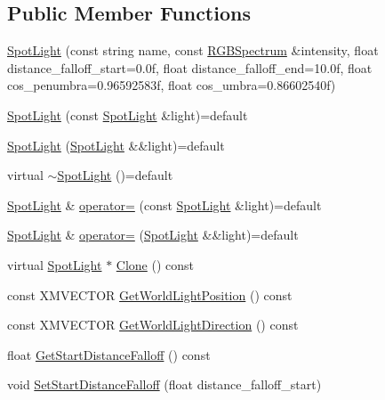 \subsection*{Public Member Functions}
\begin{DoxyCompactItemize}
\item 
\hyperlink{classmage_1_1_spot_light_a469dcb9cf484d682982c72e28003e6f7}{Spot\+Light} (const string name, const \hyperlink{structmage_1_1_r_g_b_spectrum}{R\+G\+B\+Spectrum} \&intensity, float distance\+\_\+falloff\+\_\+start=0.\+0f, float distance\+\_\+falloff\+\_\+end=10.\+0f, float cos\+\_\+penumbra=0.\+96592583f, float cos\+\_\+umbra=0.\+86602540f)
\item 
\hyperlink{classmage_1_1_spot_light_adac6974e9cbfdae4612e2d88229e654d}{Spot\+Light} (const \hyperlink{classmage_1_1_spot_light}{Spot\+Light} \&light)=default
\item 
\hyperlink{classmage_1_1_spot_light_a404e8f8f37100bff11042831ff22fe8f}{Spot\+Light} (\hyperlink{classmage_1_1_spot_light}{Spot\+Light} \&\&light)=default
\item 
virtual \hyperlink{classmage_1_1_spot_light_a924dd88ca89b3064d6cfce546eab322a}{$\sim$\+Spot\+Light} ()=default
\item 
\hyperlink{classmage_1_1_spot_light}{Spot\+Light} \& \hyperlink{classmage_1_1_spot_light_a65b316706e023797cfa219add1cf4d40}{operator=} (const \hyperlink{classmage_1_1_spot_light}{Spot\+Light} \&light)=default
\item 
\hyperlink{classmage_1_1_spot_light}{Spot\+Light} \& \hyperlink{classmage_1_1_spot_light_a540360b14d52494a792066254d1cd6db}{operator=} (\hyperlink{classmage_1_1_spot_light}{Spot\+Light} \&\&light)=default
\item 
virtual \hyperlink{classmage_1_1_spot_light}{Spot\+Light} $\ast$ \hyperlink{classmage_1_1_spot_light_a3ec29a2a0edbd1f8fd7e76ba93d6c972}{Clone} () const
\item 
const X\+M\+V\+E\+C\+T\+OR \hyperlink{classmage_1_1_spot_light_af1dc0d77fed57540e52edb59716c5094}{Get\+World\+Light\+Position} () const
\item 
const X\+M\+V\+E\+C\+T\+OR \hyperlink{classmage_1_1_spot_light_a6186ef354f57a58fbcd5ea1a7be2ec71}{Get\+World\+Light\+Direction} () const
\item 
float \hyperlink{classmage_1_1_spot_light_a78ef6cc0ecd04cff8a4db9270e9ecb99}{Get\+Start\+Distance\+Falloff} () const
\item 
void \hyperlink{classmage_1_1_spot_light_a2290be4221f8a399139920b70f5403a0}{Set\+Start\+Distance\+Falloff} (float distance\+\_\+falloff\+\_\+start)

\end{DoxyCompactItemize}

